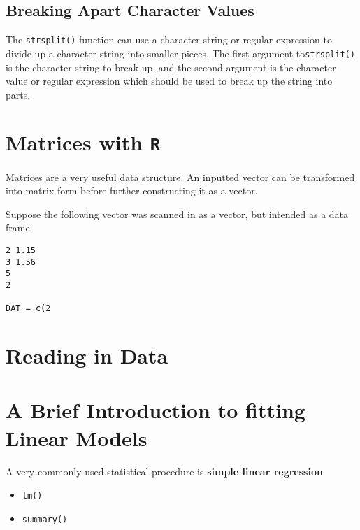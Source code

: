 \documentclass[12pt]{article} %
\begin{document}
\subsection{Breaking Apart Character Values}

The \texttt{strsplit()} function can use a character string or regular expression to divide
up a character string into smaller pieces. The first argument to\texttt{strsplit()} 
is the character string to break up, and the second argument is the character
value or regular expression which should be used to break up the string into
parts.

\newpage
\section{Matrices with \texttt{R}}

Matrices are a very useful data structure. 
An inputted vector can be transformed into matrix form before further constructing it as a vector.

Suppose the following vector was scanned in as a vector, but intended as a data frame.
\begin{framed}
\begin{verbatim}
2 1.15 
3 1.56
5
2

DAT = c(2
\end{verbatim}
\end{framed}
\section{Reading in Data}

\section{A Brief Introduction to fitting Linear Models}

A very commonly used statistical procedure is \textbf{simple linear regression}
\begin{itemize}
\item \texttt{lm()}
\item \texttt{summary()}
\end{itemize}
\end{document}
